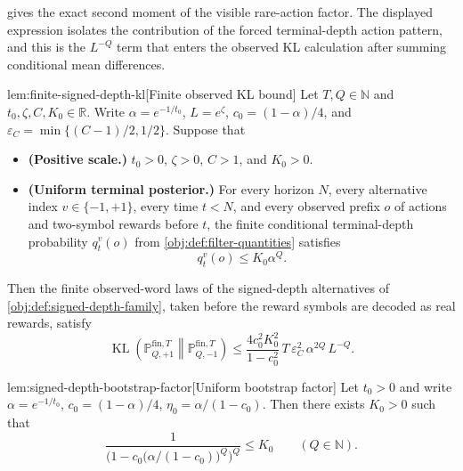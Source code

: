  gives the exact second moment of the visible rare-action factor. The displayed expression isolates the contribution of the forced terminal-depth action pattern, and this is the \(L^{-Q}\) term that enters the observed KL calculation after summing conditional mean differences.

\begin{lemmav}{lem:finite-signed-depth-kl}[Finite observed KL bound]
Let \(T,Q\in\mathbb N\) and \(t_0,\zeta,C,K_0\in\mathbb R\).  Write \(\alpha=e^{-1/t_0}\), \(L=e^\zeta\), \(c_0=(1-\alpha)/4\), and \(\varepsilon_C=\min\{(C-1)/2,1/2\}\).  Suppose that
\begin{itemize}
\item \textbf{(Positive scale.)} \(t_0>0\), \(\zeta>0\), \(C>1\), and \(K_0>0\).
\item \textbf{(Uniform terminal posterior.)} For every horizon \(N\), every alternative index \(v\in\{-1,+1\}\), every time \(t<N\), and every observed prefix \(o\) of actions and two-symbol rewards before \(t\), the finite conditional terminal-depth probability \(q_t^v(o)\) from \cref{obj:def:filter-quantities} satisfies
\[
q_t^v(o)\le K_0\alpha^Q .
\]
\end{itemize}
Then the finite observed-word laws of the signed-depth alternatives of \cref{obj:def:signed-depth-family}, taken before the reward symbols are decoded as real rewards, satisfy
\[
\operatorname{KL}\!\left(\mathbb P_{Q,+1}^{\mathrm{fin},T}\middle\|\mathbb P_{Q,-1}^{\mathrm{fin},T}\right)
\le
\frac{4c_0^2K_0^2}{1-c_0^2}\,
T\,\varepsilon_C^2\,\alpha^{2Q}\,L^{-Q}.
\]
\end{lemmav}

\begin{lemmav}{lem:signed-depth-bootstrap-factor}[Uniform bootstrap factor]
Let \(t_0>0\) and write \(\alpha=e^{-1/t_0}\), \(c_0=(1-\alpha)/4\), \(\eta_0=\alpha/(1-c_0)\). Then there exists \(K_0>0\) such that
\[
\frac{1}{\bigl(1-c_0\bigl(\alpha/(1-c_0)\bigr)^{Q}\bigr)^{Q}}
\le
K_0
\qquad(Q\in\mathbb N).
\]
\end{lemmav}

